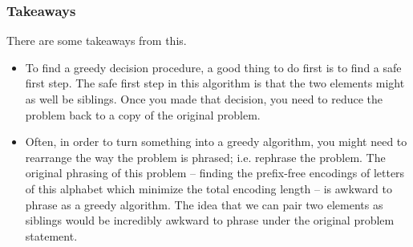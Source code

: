 \documentclass[letterpaper]{article}
\begin{document}
\subsubsection{Takeaways}
There are some takeaways from this. 
\begin{itemize}
    \item To find a greedy decision procedure, a good thing to do first is to find a safe first step. The safe first step in this algorithm is that the two elements might as well be siblings. Once you made that decision, you need to reduce the problem back to a copy of the original problem. 
    \item Often, in order to turn something into a greedy algorithm, you might need to rearrange the way the problem is phrased; i.e. rephrase the problem. The original phrasing of this problem -- finding the prefix-free encodings of letters of this alphabet which minimize the total encoding length -- is awkward to phrase as a greedy algorithm. The idea that we can pair two elements as siblings would be incredibly awkward to phrase under the original problem statement.  
\end{itemize}
\end{document}
